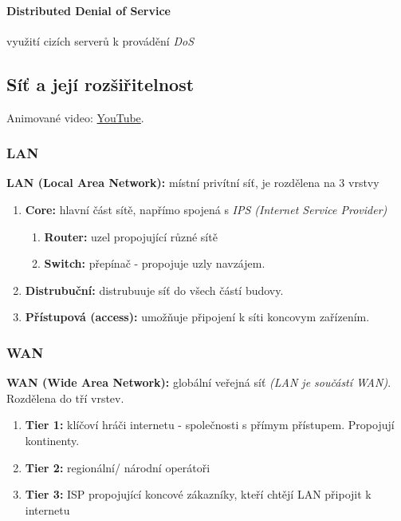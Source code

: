 \documentclass[10pt,a4paper]{article}
\begin{document}
\paragraph{Distributed Denial of Service} využití cizích serverů k provádění \textit{DoS}

\subsection{Síť a její rozšiřitelnost}
Animované video: \href{https://youtu.be/NyZWSvSj8ek}{YouTube}.

\subsubsection{LAN}

\textbf{LAN (Local Area Network):} místní privítní síť, je rozdělena na 3 vrstvy

\begin{enumerate}
    \item \textbf{Core:} hlavní část sítě, napřímo spojená s \textit{IPS (Internet Service Provider)}
        \begin{enumerate}
            \item \textbf{Router:} uzel propojující různé sítě
            \item \textbf{Switch:} přepínač - propojuje uzly navzájem.
        \end{enumerate}
    \item \textbf{Distrubuční:} distrubuuje síť do všech částí budovy.
    \item \textbf{Přístupová (access):} umožňuje připojení k síti koncovym zařízením.
\end{enumerate} 

\subsubsection{WAN}
\textbf{WAN (Wide Area Network):} globální veřejná síť \textit{(LAN je součástí WAN)}. Rozdělena do tří vrstev.

\begin{enumerate}
    \item \textbf{Tier 1:} klíčoví hráči internetu - společnosti s přímym přístupem. Propojují kontinenty.
    \item \textbf{Tier 2:} regionální/ národní operátoři
    \item \textbf{Tier 3:} ISP propojující koncové zákazníky, kteří chtějí LAN připojit k internetu
\end{enumerate}
\end{document}
